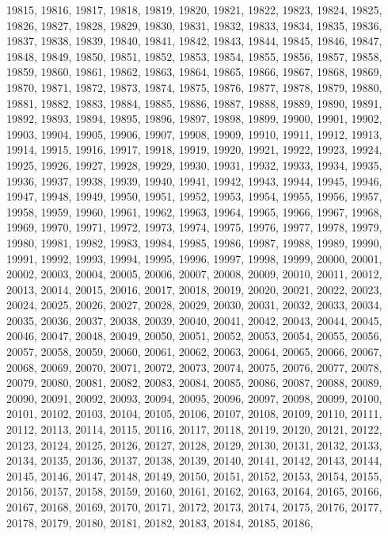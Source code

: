 19815,
19816,
19817,
19818,
19819,
19820,
19821,
19822,
19823,
19824,
19825,
19826,
19827,
19828,
19829,
19830,
19831,
19832,
19833,
19834,
19835,
19836,
19837,
19838,
19839,
19840,
19841,
19842,
19843,
19844,
19845,
19846,
19847,
19848,
19849,
19850,
19851,
19852,
19853,
19854,
19855,
19856,
19857,
19858,
19859,
19860,
19861,
19862,
19863,
19864,
19865,
19866,
19867,
19868,
19869,
19870,
19871,
19872,
19873,
19874,
19875,
19876,
19877,
19878,
19879,
19880,
19881,
19882,
19883,
19884,
19885,
19886,
19887,
19888,
19889,
19890,
19891,
19892,
19893,
19894,
19895,
19896,
19897,
19898,
19899,
19900,
19901,
19902,
19903,
19904,
19905,
19906,
19907,
19908,
19909,
19910,
19911,
19912,
19913,
19914,
19915,
19916,
19917,
19918,
19919,
19920,
19921,
19922,
19923,
19924,
19925,
19926,
19927,
19928,
19929,
19930,
19931,
19932,
19933,
19934,
19935,
19936,
19937,
19938,
19939,
19940,
19941,
19942,
19943,
19944,
19945,
19946,
19947,
19948,
19949,
19950,
19951,
19952,
19953,
19954,
19955,
19956,
19957,
19958,
19959,
19960,
19961,
19962,
19963,
19964,
19965,
19966,
19967,
19968,
19969,
19970,
19971,
19972,
19973,
19974,
19975,
19976,
19977,
19978,
19979,
19980,
19981,
19982,
19983,
19984,
19985,
19986,
19987,
19988,
19989,
19990,
19991,
19992,
19993,
19994,
19995,
19996,
19997,
19998,
19999,
20000,
20001,
20002,
20003,
20004,
20005,
20006,
20007,
20008,
20009,
20010,
20011,
20012,
20013,
20014,
20015,
20016,
20017,
20018,
20019,
20020,
20021,
20022,
20023,
20024,
20025,
20026,
20027,
20028,
20029,
20030,
20031,
20032,
20033,
20034,
20035,
20036,
20037,
20038,
20039,
20040,
20041,
20042,
20043,
20044,
20045,
20046,
20047,
20048,
20049,
20050,
20051,
20052,
20053,
20054,
20055,
20056,
20057,
20058,
20059,
20060,
20061,
20062,
20063,
20064,
20065,
20066,
20067,
20068,
20069,
20070,
20071,
20072,
20073,
20074,
20075,
20076,
20077,
20078,
20079,
20080,
20081,
20082,
20083,
20084,
20085,
20086,
20087,
20088,
20089,
20090,
20091,
20092,
20093,
20094,
20095,
20096,
20097,
20098,
20099,
20100,
20101,
20102,
20103,
20104,
20105,
20106,
20107,
20108,
20109,
20110,
20111,
20112,
20113,
20114,
20115,
20116,
20117,
20118,
20119,
20120,
20121,
20122,
20123,
20124,
20125,
20126,
20127,
20128,
20129,
20130,
20131,
20132,
20133,
20134,
20135,
20136,
20137,
20138,
20139,
20140,
20141,
20142,
20143,
20144,
20145,
20146,
20147,
20148,
20149,
20150,
20151,
20152,
20153,
20154,
20155,
20156,
20157,
20158,
20159,
20160,
20161,
20162,
20163,
20164,
20165,
20166,
20167,
20168,
20169,
20170,
20171,
20172,
20173,
20174,
20175,
20176,
20177,
20178,
20179,
20180,
20181,
20182,
20183,
20184,
20185,
20186,

